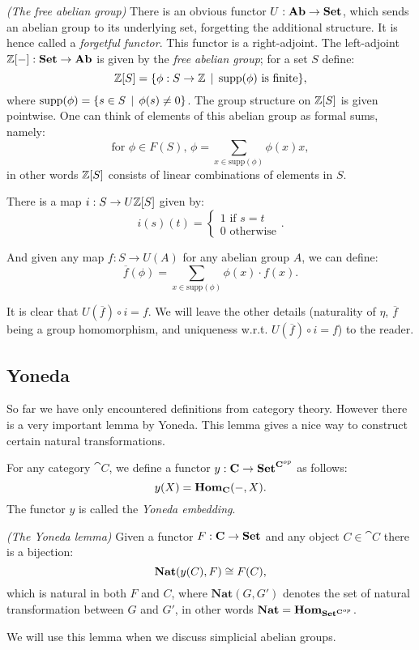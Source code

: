 \begin{example}
	\emph{(The free abelian group)} There is an obvious functor $U: \mathbf{Ab} \to \mathbf{Set}$, which sends an abelian group to its underlying set, forgetting the additional structure. It is hence called a \emph{forgetful functor}. This functor is a right-adjoint. The left-adjoint $\mathbb{Z}[-]: \mathbf{Set} \to \mathbf{Ab}$ is given by the \emph{free abelian group}; for a set $S$ define:
	$$ \mathbb{Z}[S] = \{ \phi: S \to \mathbb{Z} \,\mid\, \text{supp}(\phi) \text{ is finite}\}, $$
	where $\text{supp}(\phi) = \{ s \in S \,\mid\, \phi(s) \neq 0 \}$. The group structure on $\mathbb{Z}[S]$ is given pointwise. One can think of elements of this abelian group as formal sums, namely:
	$$ \text{for } \phi \in F(S),\, \phi = \sum_{x \in \text{supp}(\phi)}\phi(x) x, $$
	in other words $\mathbb{Z}[S]$ consists of linear combinations of elements in $S$.

	There is a map $i: S \to U\mathbb{Z}[S]$ given by:
	$$ i(s)(t) =
	\begin{cases}
		1 \text{ if } s = t \\
		0 \text{ otherwise}
	\end{cases}. $$

	And given any map $f: S \to U(A)$ for any abelian group $A$, we can define:
	$$ \overline{f}(\phi) = \sum_{x \in \text{supp}(\phi)} \phi(x) \cdot f(x). $$

	It is clear that $U(\overline{f}) \circ i = f$. We will leave the other details (naturality of $\eta$, $\overline{f}$ being a group homomorphism, and uniqueness w.r.t. $U(\overline{f}) \circ i = f$) to the reader.
\end{example}

\subsection{Yoneda}
So far we have only encountered definitions from category theory. However there is a very important lemma by Yoneda. This lemma gives a nice way to construct certain natural transformations.

\begin{definition}
	For any category $\cat{C}$, we define a functor $y:\mathbf{C} \to \mathbf{Set}^{\mathbf{C}^{op}}$ as follows:
	$$ y(X) = \mathbf{Hom}_{\mathbf{C}}(-, X). $$
	The functor $y$ is called the \emph{Yoneda embedding}.
\end{definition}

\begin{lemma}\emph{(The Yoneda lemma)}
	Given a functor $F: \mathbf{C} \to \mathbf{Set}$ and any object $C \in \cat{C}$ there is a bijection:
	$$ \mathbf{Nat}(y(C), F) \cong F(C), $$
	which is natural in both $F$ and $C$, where $\mathbf{Nat}(G, G')$ denotes the set of natural transformation between $G$ and $G'$, in other words $\mathbf{Nat} = \mathbf{Hom}_{\mathbf{Set}^{\mathbf{C}^{op}}}$.
\end{lemma}

We will use this lemma when we discuss simplicial abelian groups.